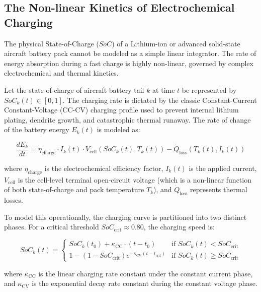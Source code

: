 \documentclass[11pt,a4paper]{book}
\begin{document}
\subsection{The Non-linear Kinetics of Electrochemical Charging}\label{sec:electrochemical_charging}

The physical State-of-Charge ($SoC$) of a Lithium-ion or advanced solid-state aircraft battery pack cannot be modeled as a simple linear integrator. The rate of energy absorption during a fast charge is highly non-linear, governed by complex electrochemical and thermal kinetics. 

Let the state-of-charge of aircraft battery tail $k$ at time $t$ be represented by $SoC_k(t) \in [0, 1]$. The charging rate is dictated by the classic Constant-Current Constant-Voltage (CC-CV) charging profile used to prevent internal lithium plating, dendrite growth, and catastrophic thermal runaway. The rate of change of the battery energy $E_k(t)$ is modeled as:

\begin{equation}
\frac{d E_k}{dt} = \eta_{\text{charge}} \cdot I_k(t) \cdot V_{\text{cell}}\left(SoC_k(t), T_k(t)\right) - \dot{Q}_{\text{loss}}\left(T_k(t), I_k(t)\right)
\end{equation}

where $\eta_{\text{charge}}$ is the electrochemical efficiency factor, $I_k(t)$ is the applied current, $V_{\text{cell}}$ is the cell-level terminal open-circuit voltage (which is a non-linear function of both state-of-charge and pack temperature $T_k$), and $\dot{Q}_{\text{loss}}$ represents thermal losses.

To model this operationally, the charging curve is partitioned into two distinct phases. For a critical threshold $SoC_{\text{crit}} \approx 0.80$, the charging speed is:

\begin{equation}
\label{eq:cccv}
SoC_k(t) = \begin{cases} 
SoC_k(t_0) + \kappa_{\text{CC}} \cdot \left(t - t_0\right) & \text{if } SoC_k(t) < SoC_{\text{crit}} \\ 
1 - \left(1 - SoC_{\text{crit}}\right) e^{-\kappa_{\text{CV}} \left(t - t_{\text{crit}}\right)} & \text{if } SoC_k(t) \ge SoC_{\text{crit}} 
\end{cases}
\end{equation}

where $\kappa_{\text{CC}}$ is the linear charging rate constant under the constant current phase, and $\kappa_{\text{CV}}$ is the exponential decay rate constant during the constant voltage phase.
\end{document}
